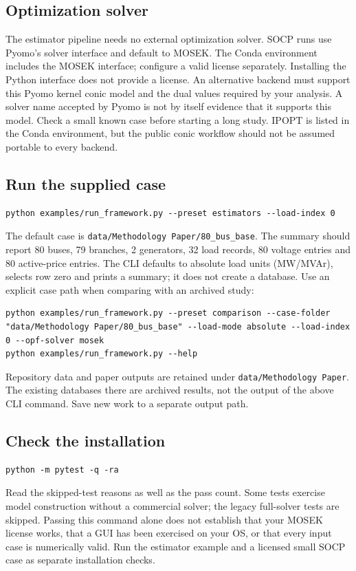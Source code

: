 \documentclass[11pt,a4paper]{article}
\newcommand{\code}[1]{\nolinkurl{#1}}
\begin{document}
\subsection{Optimization solver}
The estimator pipeline needs no external optimization solver. SOCP runs use
Pyomo's solver interface and default to MOSEK. The Conda environment includes
the MOSEK interface; configure a valid license separately.
Installing the Python interface does not provide a license.
An alternative backend must support this Pyomo kernel conic model and the
dual values required by your analysis. A solver name accepted by Pyomo is not
by itself evidence that it supports this model. Check a small known case
before starting a long study. IPOPT is listed in the Conda environment, but
the public conic workflow should not be assumed portable to every backend.

\subsection{Run the supplied case}
\begin{lstlisting}
python examples/run_framework.py --preset estimators --load-index 0
\end{lstlisting}
The default case is \code{data/Methodology Paper/80_bus_base}. The summary
should report 80 buses, 79 branches, 2 generators, 32 load records, 80 voltage
entries and 80 active-price entries. The CLI defaults to absolute load units
(MW/MVAr), selects row zero and prints a summary; it does not create a database.
Use an explicit case path when comparing with an archived study:
\begin{lstlisting}
python examples/run_framework.py --preset comparison --case-folder "data/Methodology Paper/80_bus_base" --load-mode absolute --load-index 0 --opf-solver mosek
python examples/run_framework.py --help
\end{lstlisting}
Repository data and paper outputs are retained under \code{data/Methodology Paper}.
The existing databases there are archived results, not the output of the above
CLI command. Save new work to a separate output path.

\subsection{Check the installation}
\begin{lstlisting}
python -m pytest -q -ra
\end{lstlisting}
Read the skipped-test reasons as well as the pass count. Some tests exercise
model construction without a commercial solver; the legacy full-solver tests
are skipped. Passing this command alone does not establish that your MOSEK
license works, that a GUI has been exercised on your OS, or that every input
case is numerically valid. Run the estimator example and a licensed small
SOCP case as separate installation checks.
\end{document}
